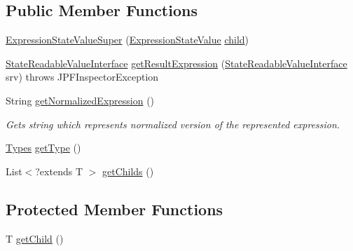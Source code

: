 \subsection*{Public Member Functions}
\begin{DoxyCompactItemize}
\item 
\hyperlink{classgov_1_1nasa_1_1jpf_1_1inspector_1_1server_1_1expression_1_1expressions_1_1_expression_state_value_super_ad83f95a76e1fa64c1fd17766b8bbd804}{Expression\+State\+Value\+Super} (\hyperlink{classgov_1_1nasa_1_1jpf_1_1inspector_1_1server_1_1expression_1_1expressions_1_1_expression_state_value}{Expression\+State\+Value} \hyperlink{classgov_1_1nasa_1_1jpf_1_1inspector_1_1server_1_1expression_1_1_expression_state_unary_operator_a66041b1f569a361549e28a00f7ca5f2f}{child})
\item 
\hyperlink{interfacegov_1_1nasa_1_1jpf_1_1inspector_1_1server_1_1programstate_1_1_state_readable_value_interface}{State\+Readable\+Value\+Interface} \hyperlink{classgov_1_1nasa_1_1jpf_1_1inspector_1_1server_1_1expression_1_1expressions_1_1_expression_state_value_super_aad18eb7ce29a1a3ee65ff73cfc63b5e5}{get\+Result\+Expression} (\hyperlink{interfacegov_1_1nasa_1_1jpf_1_1inspector_1_1server_1_1programstate_1_1_state_readable_value_interface}{State\+Readable\+Value\+Interface} srv)  throws J\+P\+F\+Inspector\+Exception 
\item 
String \hyperlink{classgov_1_1nasa_1_1jpf_1_1inspector_1_1server_1_1expression_1_1expressions_1_1_expression_state_value_super_a0e3c6a2aced7b9791f5c0842c734b78d}{get\+Normalized\+Expression} ()
\begin{DoxyCompactList}\small\item\em Gets string which represents normalized version of the represented expression. \end{DoxyCompactList}\item 
\hyperlink{enumgov_1_1nasa_1_1jpf_1_1inspector_1_1server_1_1expression_1_1_types}{Types} \hyperlink{classgov_1_1nasa_1_1jpf_1_1inspector_1_1server_1_1expression_1_1expressions_1_1_expression_state_value_a9317f49f60c166a2f46f90702e75f22e}{get\+Type} ()
\item 
List$<$?extends T $>$ \hyperlink{classgov_1_1nasa_1_1jpf_1_1inspector_1_1server_1_1expression_1_1_expression_state_unary_operator_ad010bcb9c4e2eb584321b5ceba8e1682}{get\+Childs} ()
\end{DoxyCompactItemize}
\subsection*{Protected Member Functions}
\begin{DoxyCompactItemize}
\item 
T \hyperlink{classgov_1_1nasa_1_1jpf_1_1inspector_1_1server_1_1expression_1_1_expression_state_unary_operator_a150bac338d6557f79ca185d3f6ad6e06}{get\+Child} ()
\end{DoxyCompactItemize}
